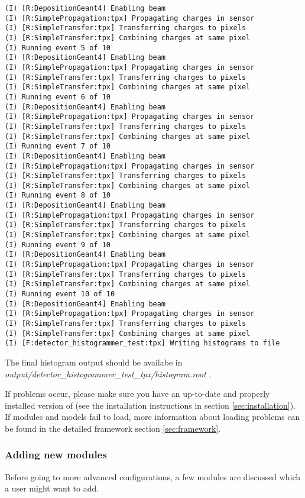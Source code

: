 \begin{lstlisting}[breaklines]
(I) [R:DepositionGeant4] Enabling beam
(I) [R:SimplePropagation:tpx] Propagating charges in sensor
(I) [R:SimpleTransfer:tpx] Transferring charges to pixels
(I) [R:SimpleTransfer:tpx] Combining charges at same pixel
(I) Running event 5 of 10
(I) [R:DepositionGeant4] Enabling beam
(I) [R:SimplePropagation:tpx] Propagating charges in sensor
(I) [R:SimpleTransfer:tpx] Transferring charges to pixels
(I) [R:SimpleTransfer:tpx] Combining charges at same pixel
(I) Running event 6 of 10
(I) [R:DepositionGeant4] Enabling beam
(I) [R:SimplePropagation:tpx] Propagating charges in sensor
(I) [R:SimpleTransfer:tpx] Transferring charges to pixels
(I) [R:SimpleTransfer:tpx] Combining charges at same pixel
(I) Running event 7 of 10
(I) [R:DepositionGeant4] Enabling beam
(I) [R:SimplePropagation:tpx] Propagating charges in sensor
(I) [R:SimpleTransfer:tpx] Transferring charges to pixels
(I) [R:SimpleTransfer:tpx] Combining charges at same pixel
(I) Running event 8 of 10
(I) [R:DepositionGeant4] Enabling beam
(I) [R:SimplePropagation:tpx] Propagating charges in sensor
(I) [R:SimpleTransfer:tpx] Transferring charges to pixels
(I) [R:SimpleTransfer:tpx] Combining charges at same pixel
(I) Running event 9 of 10
(I) [R:DepositionGeant4] Enabling beam
(I) [R:SimplePropagation:tpx] Propagating charges in sensor
(I) [R:SimpleTransfer:tpx] Transferring charges to pixels
(I) [R:SimpleTransfer:tpx] Combining charges at same pixel
(I) Running event 10 of 10
(I) [R:DepositionGeant4] Enabling beam
(I) [R:SimplePropagation:tpx] Propagating charges in sensor
(I) [R:SimpleTransfer:tpx] Transferring charges to pixels
(I) [R:SimpleTransfer:tpx] Combining charges at same pixel
(I) [F:detector_histogrammer_test:tpx] Writing histograms to file
\end{lstlisting}
The final histogram output should be availabe in \\ \textit{output/detector\_histogrammer\_test\_tpx/histogram.root} .

If problems occur, please make sure you have an up-to-date and properly installed version of \apsq (see the installation instructions in section \ref{sec:installation}). If modules and models fail to load, more information about loading problems can be found in the detailed framework section \ref{sec:framework}.

\subsubsection{Adding new modules}
Before going to more advanced configurations, a few modules are discussed which a user might want to add.

